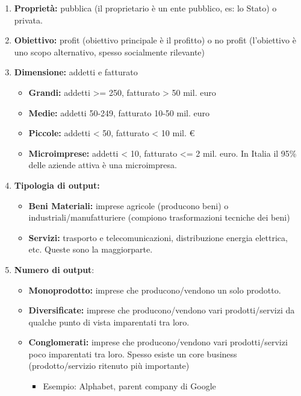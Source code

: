 \documentclass[../main.tex]{subfiles}
\begin{document}
\begin{enumerate}
\item \textbf{Proprietà:} pubblica (il proprietario è un ente pubblico, es: lo Stato) o privata.

\item \textbf{Obiettivo:} profit (obiettivo principale è il profitto) o no profit (l'obiettivo è uno scopo alternativo, spesso socialmente rilevante)

\item \textbf{Dimensione:} addetti e fatturato
	\begin{itemize}
	\item
	\textbf{Grandi:} addetti >= 250, fatturato > 50 mil. euro
	\item \textbf{Medie:} addetti 50-249, fatturato 10-50 mil. euro
	\item \textbf{Piccole:} addetti < 50, fatturato < 10 mil. €
	\item \textbf{Microimprese:} addetti < 10, fatturato <= 2 mil. euro. In Italia il 95\% delle aziende attiva è una microimpresa.
	\end{itemize}

\item \textbf{Tipologia di output:}
	\begin{itemize}
	\item
	\textbf{Beni Materiali:} imprese agricole (producono beni) o industriali/manufatturiere (compiono trasformazioni tecniche dei beni)
	
	\item \textbf{Servizi:} trasporto e telecomunicazioni, distribuzione energia elettrica, etc. Queste sono la maggiorparte.
	\end{itemize}

\item \textbf{Numero di output}:
	\begin{itemize}
	\item \textbf{Monoprodotto:} imprese che producono/vendono un solo prodotto.
	\item  \textbf{Diversificate:} imprese che producono/vendono vari prodotti/servizi da qualche punto di vista imparentati tra loro.
	\item \textbf{Conglomerati:} imprese che producono/vendono vari prodotti/servizi poco imparentati tra loro. Spesso esiste un core business (prodotto/servizio ritenuto più importante)
		\begin{itemize}
		\item Esempio: Alphabet, parent company di Google
		\end{itemize}
	\end{itemize}


\end{enumerate}
\end{document}
